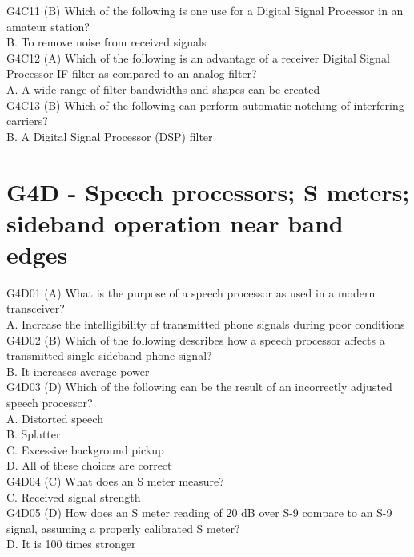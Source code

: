 \documentclass[12pt,letterpaper]{report}
\begin{document}
G4C11 (B) Which of the following is one use for a Digital Signal Processor in an amateur station?\\
B. To remove noise from received signals\\

G4C12 (A) Which of the following is an advantage of a receiver Digital Signal Processor IF filter as compared to an analog filter? \\
A. A wide range of filter bandwidths and shapes can be created\\

G4C13 (B) Which of the following can perform automatic notching of interfering carriers?\\
B. A Digital Signal Processor (DSP) filter\\

\section{G4D - Speech processors; S meters; sideband operation near band edges}

G4D01 (A) What is the purpose of a speech processor as used in a modern transceiver?\\
A. Increase the intelligibility of transmitted phone signals during poor conditions \\

G4D02 (B) Which of the following describes how a speech processor affects a transmitted single sideband phone signal?\\
B. It increases average power\\

G4D03 (D) Which of the following can be the result of an incorrectly adjusted speech processor?\\
A. Distorted speech\\
B. Splatter\\
C. Excessive background pickup\\
D. All of these choices are correct\\

G4D04 (C) What does an S meter measure?\\
C. Received signal strength\\

G4D05 (D) How does an S meter reading of 20 dB over S-9 compare to an S-9 signal, assuming a properly calibrated S meter?\\
D. It is 100 times stronger\\
\end{document}
